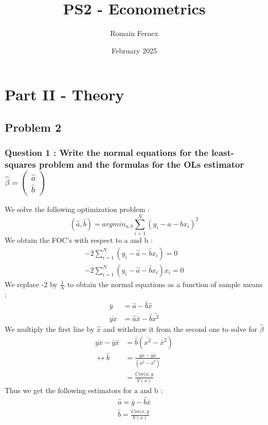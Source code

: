 \documentclass{article}
\title{PS2 - Econometrics}
\author{Romain Fernex}
\date{February 2025}
\begin{document}
\maketitle
\tableofcontents


\section{Part II - Theory}

\subsection{Problem 2}

\subsubsection{Question 1 : Write the normal equations for the least-squares problem and the formulas for the OLs estimator $\hat{\beta} = \begin{pmatrix} \hat{a} \\ \hat{b }\end{pmatrix}$}
We solve the following optimization problem : 
\begin{equation}
    (\hat{a},\hat{b}) = argmin_{a,b}\sum_{i=1}^N(y_i-a-bx_i)^2
\end{equation}
We obtain the FOC's with respect to a and b : 
\begin{equation}
\begin{aligned}
    -2\sum_{i=1}^N (y_i-\hat{a}-\hat{b}x_i) = 0 \\
    -2\sum_{i=1}^N (y_i-\hat{a}-\hat{b}x_i)x_i = 0
\end{aligned}
\end{equation}
We replace -2 by $\frac{1}{N}$ to obtain the normal equations as a function of sample means : 
\begin{equation}
\begin{aligned}
    \bar{y} &= \hat{a}-\hat{b}\hat{x} \\
    \bar{yx} &= \hat{a}\bar{x}-\hat{b}\bar{x^2}
\end{aligned}
\end{equation}
We multiply the first line by $\hat{x}$ and withdraw it from the second one to solve for $\hat{\beta}$
\begin{equation}
\begin{aligned}
    \bar{yx}-\bar{y}\bar{x} &= \hat{b}(\bar{x^2}-\bar{x}^2)\\
    \leftrightarrow \hat{b} &= \frac{\bar{yx}-\bar{y}\bar{x}}{(\bar{x^2}-\bar{x}^2)}\\
    &= \frac{Cov(x,y}{V(x)}
\end{aligned}
\end{equation}
Thus we get the following estimators for a and b : 
\begin{equation}
\begin{aligned}
    \hat{a} = \bar{y}-\hat{b}\bar{x}\\
    \hat{b} = \frac{Cov(x,y}{V(x)}
\end{aligned}
\end{equation}
\end{document}
